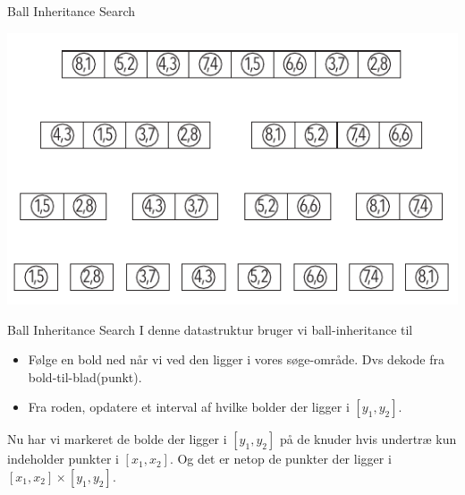 \documentclass[pdf]{beamer}
\begin{document}
\begin{frame}{Ball Inheritance Search}
  \begin{center}
    \includegraphics[scale=1.0]{pictures/bolde_med_to_tal.pdf}
  \end{center}
\end{frame}


\begin{frame}{Ball Inheritance Search}
  I denne datastruktur bruger vi ball-inheritance til
  \begin{itemize}
    \item Følge en bold ned når vi ved den ligger i vores søge-område. Dvs dekode fra bold-til-blad(punkt).
    \item Fra roden, opdatere et interval af hvilke bolder der ligger i $[y_1, y_2]$.
  \end{itemize}

  Nu har vi markeret de bolde der ligger i $[y_1, y_2]$ på de knuder hvis undertræ kun indeholder punkter i $[x_1, x_2]$. Og det er netop de punkter der ligger i $[x_1, x_2] \times [y_1, y_2]$.
\end{frame}
\end{document}
